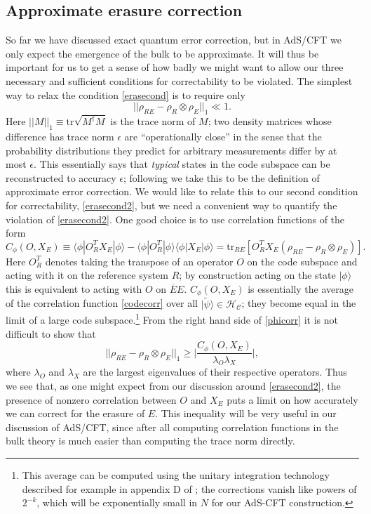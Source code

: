 \documentclass[11pt]{article}
\newcommand{\be}{\begin{equation}}
\newcommand{\ee}{\end{equation}}
\newcommand{\tr}{\mathrm{tr}}
\newcommand{\HC}{\mathcal{H}_{\mathcal{C}}}
\newcommand{\lan}{\langle}
\newcommand{\ran}{\rangle}
\newcommand{\wt}{\widetilde}
\newcommand{\ol}{\overline}
\begin{document}
\subsection{Approximate erasure correction}\label{appxsec}
So far we have discussed exact quantum error correction, but in AdS/CFT we only expect the emergence of the bulk to be approximate.  It will thus be important for us to get a sense of how badly we might want to allow our three necessary and sufficient conditions for correctability to be violated.  The simplest way to relax the condition \eqref{erasecond} is to require only \cite{schumacher2002approximate}
\be\label{erasecondappx}
||\rho_{RE}-\rho_R\otimes \rho_E||_1\ll 1.
\ee
Here $||M||_1\equiv\mathrm{tr}\sqrt{M^\dagger M}$ is the trace norm of $M$; two density matrices whose difference has trace norm $\epsilon$ are ``operationally close'' in the sense that the probability distributions they predict for arbitrary measurements differ by at most $\epsilon$.  This essentially says that \textit{typical} states in the code subspace can be reconstructed to accuracy $\epsilon$; following \cite{schumacher2002approximate} we take this to be the definition of approximate error correction.  We would like to relate this to our second condition for correctability, \eqref{erasecond2}, but we need a convenient way to quantify the violation of \eqref{erasecond2}.  One good choice is to use correlation functions of the form
\be\label{phicorr}
C_\phi(O,X_E)\equiv\lan \phi|O^T_R X_E|\phi\ran-\lan\phi|O^T_R|\phi\ran\lan\phi|X_E|\phi\ran=\tr_{RE} \left[O^T_R X_E\left(\rho_{RE}-\rho_R\otimes\rho_E\right)\right].
\ee
Here $O^T_R$ denotes taking the transpose of an operator $O$ on the code subspace and acting with it on the reference system $R$; by construction acting on the state $|\phi\ran$ this is equivalent to acting with $O$ on $\ol{E}E$.  $C_\phi(O,X_E)$ is essentially the average of the correlation function \eqref{codecorr} over all $|\wt{\psi}\ran\in \HC$; they become equal in the limit of a large code subspace.\footnote{This average can be computed using the unitary integration technology described for example in appendix D of \cite{Harlow:2014yka}; the corrections vanish like powers of $2^{-k}$, which will be exponentially small in $N$ for our AdS-CFT construction.}  From the right hand side of \eqref{phicorr} it is not difficult to show that \cite{wolf2008area}
\be\label{cirac}
||\rho_{RE}-\rho_R\otimes \rho_E||_1\geq \Big|\frac{C_\phi(O,X_E)}{\lambda_O\lambda_X}\Big|,
\ee
where $\lambda_O$ and $\lambda_X$ are the largest eigenvalues of their respective operators.  Thus we see that, as one might expect from our discussion around \eqref{erasecond2}, the presence of nonzero correlation between $O$ and $X_E$ puts a limit on how accurately we can correct for the erasure of $E$.  This inequality will be very useful in our discussion of AdS/CFT, since after all computing correlation functions in the bulk theory is much easier than computing the trace norm directly.
\end{document}
